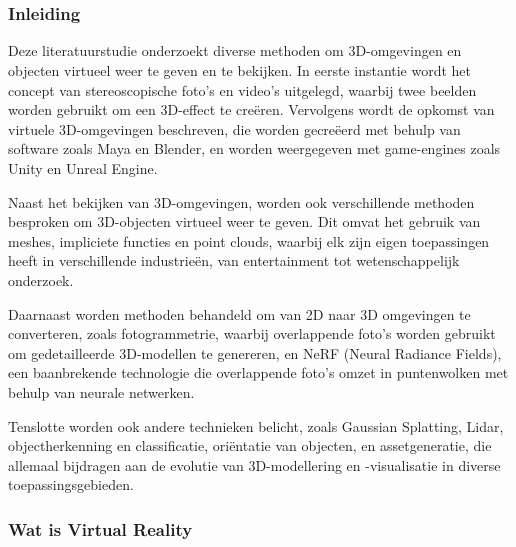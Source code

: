 \chapter{}%
\label{ch:stand-van-zaken}


\subsection{Inleiding}

Deze literatuurstudie onderzoekt diverse methoden om 3D-omgevingen en objecten virtueel weer te geven en te bekijken. In eerste instantie wordt het concept van stereoscopische foto's en video's uitgelegd, waarbij twee beelden worden gebruikt om een 3D-effect te creëren. Vervolgens wordt de opkomst van virtuele 3D-omgevingen beschreven, die worden gecreëerd met behulp van software zoals Maya en Blender, en worden weergegeven met game-engines zoals Unity en Unreal Engine.

Naast het bekijken van 3D-omgevingen, worden ook verschillende methoden besproken om 3D-objecten virtueel weer te geven. Dit omvat het gebruik van meshes, impliciete functies en point clouds, waarbij elk zijn eigen toepassingen heeft in verschillende industrieën, van entertainment tot wetenschappelijk onderzoek. 

Daarnaast worden methoden behandeld om van 2D naar 3D omgevingen te converteren, zoals fotogrammetrie, waarbij overlappende foto's worden gebruikt om gedetailleerde 3D-modellen te genereren, en NeRF (Neural Radiance Fields), een baanbrekende technologie die overlappende foto's omzet in puntenwolken met behulp van neurale netwerken. 

Tenslotte worden ook andere technieken belicht, zoals Gaussian Splatting, Lidar, objectherkenning en classificatie, oriëntatie van objecten, en assetgeneratie, die allemaal bijdragen aan de evolutie van 3D-modellering en -visualisatie in diverse toepassingsgebieden.

\subsection{Wat is Virtual Reality}

